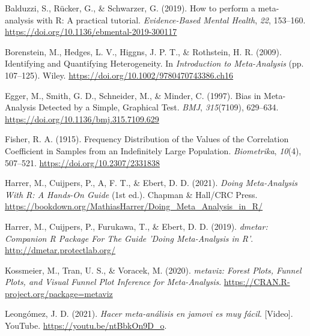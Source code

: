 \documentclass[
  bookmarksnumbered]{article}
\newlength{\cslhangindent}
\newlength{\cslentryspacingunit} %
\newenvironment{CSLReferences}[2] %
 {%
  \setlength{\parindent}{0pt}
  \ifodd #1
  \let\oldpar\par
  \def\par{\hangindent=\cslhangindent\oldpar}
  \fi
  \setlength{\parskip}{#2\cslentryspacingunit}
 }%
 {}
\begin{document}
\hypertarget{refs}{}
\begin{CSLReferences}{1}{0}
\leavevmode{}%
Balduzzi, S., Rücker, G., \& Schwarzer, G. (2019). How to perform a meta-analysis with {R}: A practical tutorial. \emph{Evidence-Based Mental Health}, \emph{22}, 153--160. \url{https://doi.org/10.1136/ebmental-2019-300117}

\leavevmode{}%
Borenstein, M., Hedges, L. V., Higgns, J. P. T., \& Rothstein, H. R. (2009). Identifying and {Quantifying Heterogeneity}. In \emph{Introduction to {Meta}-{Analysis}} (pp. 107--125). Wiley. \url{https://doi.org/10.1002/9780470743386.ch16}

\leavevmode{}%
Egger, M., Smith, G. D., Schneider, M., \& Minder, C. (1997). {Bias in Meta-Analysis Detected by a Simple, Graphical Test}. \emph{BMJ}, \emph{315}(7109), 629--634. \url{https://doi.org/10.1136/bmj.315.7109.629}

\leavevmode{}%
Fisher, R. A. (1915). Frequency {Distribution} of the {Values} of the {Correlation Coefficient} in {Samples} from an {Indefinitely Large Population}. \emph{Biometrika}, \emph{10}(4), 507--521. \url{https://doi.org/10.2307/2331838}

\leavevmode{}%
Harrer, M., Cuijpers, P., A, F. T., \& Ebert, D. D. (2021). \emph{{Doing Meta-Analysis With {R}: A Hands-On Guide}} (1st ed.). Chapman \& Hall/CRC Press. \url{https://bookdown.org/MathiasHarrer/Doing_Meta_Analysis_in_R/}

\leavevmode{}%
Harrer, M., Cuijpers, P., Furukawa, T., \& Ebert, D. D. (2019). \emph{{dmetar: Companion R Package For The Guide 'Doing Meta-Analysis in R'}}. \url{http://dmetar.protectlab.org/}

\leavevmode{}%
Kossmeier, M., Tran, U. S., \& Voracek, M. (2020). \emph{{metaviz: Forest Plots, Funnel Plots, and Visual Funnel Plot Inference for Meta-Analysis}}. \url{https://CRAN.R-project.org/package=metaviz}

\leavevmode{}%
Leongómez, J. D. (2021). \emph{Hacer meta-análisis en jamovi es muy fácil}. {[}Video{]}. YouTube. \url{https://youtu.be/ntBbkOn9D_o}.


\end{CSLReferences}
\end{document}
